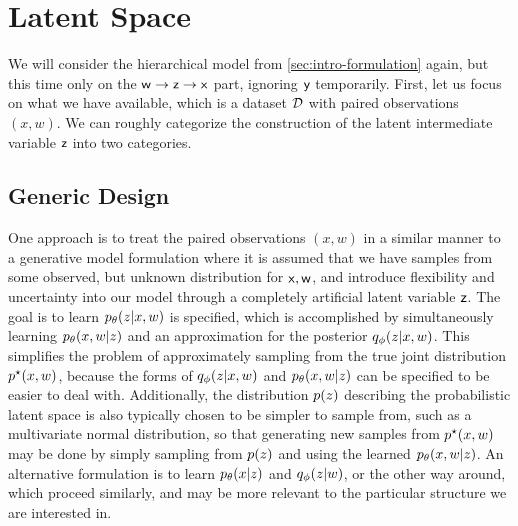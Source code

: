 \section{Latent Space}
\label{sec:intro-latent}

We will consider the hierarchical model from \cref{sec:intro-formulation} again, but this time only on the $\mathsf w\to\mathsf z\to\mathsf x$ part, ignoring $\mathsf y$ temporarily. First, let us focus on what we have available, which is a dataset $\mathcal D$ with paired observations $(x,w)$. We can roughly categorize the construction of the latent intermediate variable $\mathsf z$ into two categories.

\subsection{Generic Design}
\label{subsec:intro-latent-artificial}

One approach is to treat the paired observations $(x,w)$ in a similar manner to a generative model formulation where it is assumed that we have samples from some observed, but unknown distribution for $\mathsf x, \mathsf w$, and introduce flexibility and uncertainty into our model through a completely artificial latent variable $\mathsf z$. The goal is to learn $\pld{z\given x,w}$ is specified, which is accomplished by simultaneously learning $\pld{x,w\given z}$ and an approximation for the posterior $\qvd{z\given x,w}$. This simplifies the problem of approximately sampling from the true joint distribution $\ptd{x,w}$, because the forms of $\qvd{z\given x,w}$ and $\pld{x,w\given z}$ can be specified to be easier to deal with. Additionally, the distribution $\pd{z}$ describing the probabilistic latent space is also typically chosen to be simpler to sample from, such as a multivariate normal distribution, so that generating new samples from $\ptd{x,w}$ may be done by simply sampling from $\pd{z}$ and using the learned $\pld{x,w\given z}$. An alternative formulation is to learn $\pld{x\given z}$ and $\qvd{z\given w}$, or the other way around, which proceed similarly, and may be more relevant to the particular structure we are interested in.

